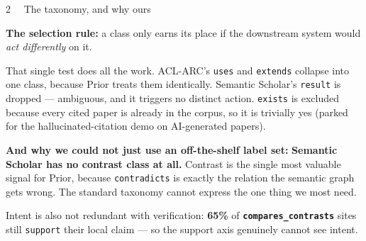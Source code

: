 \documentclass[final]{beamer}
\newcommand{\ttx}[1]{\texttt{#1}}
\newcommand{\clscmp}{\textcolor{pRust}{\textbf{\texttt{compares\_contrasts}}}}
\newcommand{\num}[1]{\textcolor{pDeep}{\textbf{#1}}}
\newcommand{\smallbody}{\fontsize{19}{24}\selectfont}
\newlength{\colw}
\begin{document}
\begin{frame}[t]{}
\begin{minipage}[t]{\colw}
\begin{pblock}{2 \ \ The taxonomy, and why ours}
\begin{pnote}
\smallbody
\textbf{The selection rule:} a class only earns its place if the downstream system would
\emph{act differently} on it.
\end{pnote}

That single test does all the work. ACL-ARC's \ttx{uses} and \ttx{extends} collapse into
one class, because Prior treats them identically. Semantic Scholar's \ttx{result} is
dropped --- ambiguous, and it triggers no distinct action. \ttx{exists} is excluded because
every cited paper is already in the corpus, so it is trivially yes (parked for the
hallucinated-citation demo on AI-generated papers).

\medskip
\textbf{And why we could not just use an off-the-shelf label set:}
\textcolor{pRust}{\textbf{Semantic Scholar has no contrast class at all.}} Contrast is the
single most valuable signal for Prior, because \ttx{contradicts} is exactly the relation
the semantic graph gets wrong. The standard taxonomy cannot express the one thing we most
need.

\medskip
Intent is also not redundant with verification: \num{65\%} of \clscmp{} sites still
\ttx{support} their local claim --- so the support axis genuinely cannot see intent.

\bigskip
\begin{center}
\end{center}
\end{pblock}
\end{minipage}
\end{frame}
\end{document}
